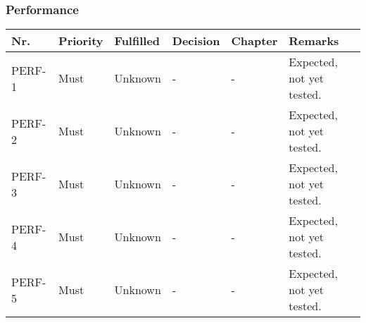 	\subsubsection{Performance}
	\begin{table}[H]
	\begin{tabular}{lllllL{0.4\textwidth}}
	
	Nr.    & Priority & Fulfilled & Decision & Chapter & Remarks \\ \hline
	
	PERF-1 & Must     & Unknown  & - & -         & Expected, not yet tested. \\ \hline
	
	PERF-2 & Must     & Unknown  & - & -         & Expected, not yet tested. \\ \hline
	
	PERF-3 & Must     & Unknown  & - & -         & Expected, not yet tested. \\ \hline
	
	PERF-4 & Must     & Unknown  & - & -         & Expected, not yet tested. \\ \hline
	
	PERF-5 & Must     & Unknown  & - & -         & Expected, not yet tested. \\ \hline
						
	\end{tabular}
\end{table}

